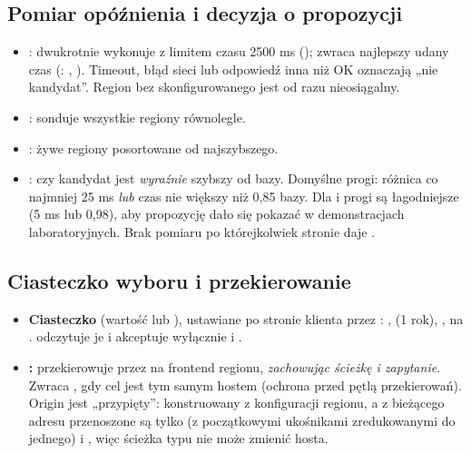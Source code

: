 \subsection{Pomiar opóźnienia i decyzja o propozycji}

\begin{itemize}[nosep]
  \item {}: dwukrotnie wykonuje
         z limitem czasu 2500 ms
        (); zwraca najlepszy udany czas (: , ).
        Timeout, błąd sieci lub odpowiedź inna niż OK oznaczają „nie kandydat”. Region bez
        skonfigurowanego  jest od razu nieosiągalny.
  \item {}: sonduje wszystkie regiony równolegle.
  \item {}: żywe regiony posortowane od najszybszego.
  \item {}: czy kandydat
        jest \emph{wyraźnie} szybszy od bazy. Domyślne progi: różnica co najmniej 25 ms \emph{lub}
        czas nie większy niż 0,85 bazy. Dla  i  progi są łagodniejsze
        (5 ms lub 0,98), aby propozycję dało się pokazać w demonstracjach laboratoryjnych. Brak
        pomiaru po którejkolwiek stronie daje .
\end{itemize}

\subsection{Ciasteczko wyboru i przekierowanie}

\begin{itemize}[nosep]
  \item \textbf{Ciasteczko } (wartość  lub ), ustawiane po stronie klienta
        przez : ,  (1 rok), ,
         na .  odczytuje je i akceptuje wyłącznie
         i .
  \item \textbf{:} przekierowuje przez 
        na frontend regionu, \emph{zachowując ścieżkę i zapytanie}. Zwraca , gdy cel jest tym
        samym hostem (ochrona przed pętlą przekierowań). Origin jest „przypięty”: konstruowany z
        konfiguracji regionu, a z bieżącego adresu przenoszone są tylko  (z początkowymi
        ukośnikami zredukowanymi do jednego) i , więc ścieżka typu 
        nie może zmienić hosta.
\end{itemize}

